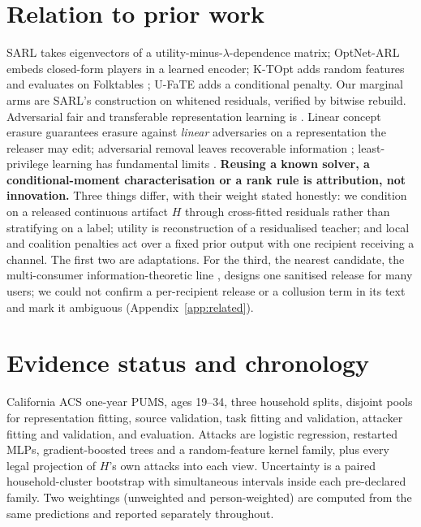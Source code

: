 \documentclass[10pt]{article}
\begin{document}
\section{Relation to prior work}
\label{sec:related}

SARL \citep{sadeghi2019sarl} takes eigenvectors of a utility-minus-$\lambda$-dependence matrix; OptNet-ARL
\citep{sadeghi2021optnetarl} embeds closed-form players in a learned encoder; K-TOpt \citep{sadeghi2022ktopt}
adds random features and evaluates on Folktables \citep{ding2021retiring}; U-FaTE \citep{dehdashtian2024ufate}
adds a conditional penalty. Our marginal arms are SARL's construction on whitened residuals, verified by
bitwise rebuild. Adversarial fair and transferable representation learning is \citet{madras2018laftr}. Linear
concept erasure \citep{belrose2023leace,holstege2025splince} guarantees erasure against \emph{linear}
adversaries on a representation the releaser may edit; adversarial removal leaves recoverable information
\citep{elazar2018adversarial}; least-privilege learning has fundamental limits
\citep{stadler2024leastprivilege}. \textbf{Reusing a known solver, a conditional-moment characterisation or a
rank rule is attribution, not innovation.} Three things differ, with their weight stated honestly: we
condition on a released continuous artifact $H$ through cross-fitted residuals rather than stratifying on a
label; utility is reconstruction of a residualised teacher; and local and coalition penalties act over a fixed
prior output with one recipient receiving a channel. The first two are adaptations. For the third, the nearest
candidate, the multi-consumer information-theoretic line \citep{sankar2013utility}, designs one sanitised
release for many users; we could not confirm a per-recipient release or a collusion term in its text and mark
it ambiguous (Appendix~\ref{app:related}).

\section{Evidence status and chronology}
\label{sec:design}

California ACS one-year PUMS, ages 19--34, three household splits, disjoint pools for representation
fitting, source validation, task fitting and validation, attacker fitting and validation, and evaluation.
Attacks are logistic regression, restarted MLPs, gradient-boosted trees and a random-feature kernel family,
plus every legal projection of $H$'s own attacks into each view. Uncertainty is a paired household-cluster
bootstrap with simultaneous intervals inside each pre-declared family. Two weightings (unweighted and
person-weighted) are computed from the same predictions and reported separately throughout.
\end{document}
